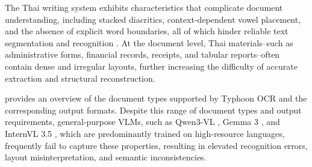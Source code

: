 \documentclass[]{typhoon} %
\begin{document}
The Thai writing system exhibits characteristics that complicate document understanding, including stacked diacritics, context-dependent vowel placement, and the absence of explicit word boundaries, all of which hinder reliable text segmentation and recognition \citep{4600388}. At the document level, Thai materials--such as administrative forms, financial records, receipts, and tabular reports--often contain dense and irregular layouts, further increasing the difficulty of accurate extraction and structural reconstruction.

 provides an overview of the document types supported by Typhoon OCR and the corresponding output formats. Despite this range of document types and output requirements, general-purpose VLMs, such as Qwen3-VL \citep{wei2025deepseekocrcontextsopticalcompression}, Gemma 3 \citep{gemmateam2025gemma3technicalreport}, and InternVL 3.5 \citep{wang2025internvl35advancingopensourcemultimodal}, which are predominantly trained on high-resource languages, frequently fail to capture these properties, resulting in elevated recognition errors, layout misinterpretation, and semantic inconsistencies.
\end{document}
